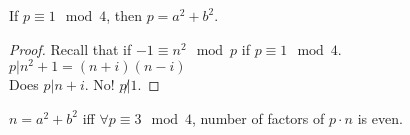     \begin{theorem}
      If $p \equiv 1 \mod 4$, then $p = a^2 + b^2$.
    \end{theorem}
    \begin{proof}
      Recall that if $-1 \equiv n^2 \mod p$ if $p \equiv 1 \mod 4$.\\
      $p | n^2 + 1 = (n+i)(n-i)$\\
      Does $p | n + i$. No! $p \not| 1$.
    \end{proof}
    \begin{theorem}
      $n = a^2 + b^2$ iff $\forall p \equiv 3 \mod 4$, number of factors of 
      $p \cdot n$ is even.
    \end{theorem}
